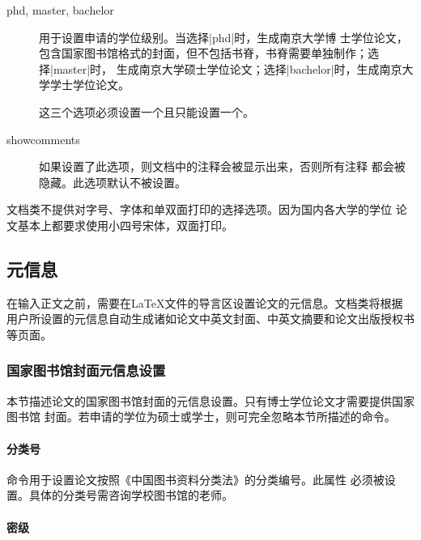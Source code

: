 \begin{description}
\item[phd, master, bachelor] 用于设置申请的学位级别。当选择|phd|时，生成南京大学博
士学位论文，包含国家图书馆格式的封面，但不包括书脊，书脊需要单独制作；选择|master|时，
生成南京大学硕士学位论文；选择|bachelor|时，生成南京大学学士学位论文。
\begin{note}
这三个选项必须设置一个且只能设置一个。
\end{note}

\item[showcomments] 如果设置了此选项，则文档中的注释会被显示出来，否则所有注释
都会被隐藏。此选项默认不被设置。

\end{description}

{\njuthesis}文档类不提供对字号、字体和单双面打印的选择选项。因为国内各大学的学位
论文基本上都要求使用小四号宋体，双面打印。

\subsection{元信息}

在输入正文之前，需要在{\LaTeX}文件的导言区设置论文的元信息。{\njuthesis}文档类将根据
用户所设置的元信息自动生成诸如论文中英文封面、中英文摘要和论文出版授权书等页面。

\subsubsection{国家图书馆封面元信息设置}

本节描述论文的国家图书馆封面的元信息设置。只有博士学位论文才需要提供国家图书馆
封面。若申请的学位为硕士或学士，则可完全忽略本节所描述的命令。

\paragraph{分类号}

命令用于设置论文按照《中国图书资料分类法》的分类编号。此属性
必须被设置。具体的分类号需咨询学校图书馆的老师。
\begin{tex}
\end{tex}

\paragraph{密级}


